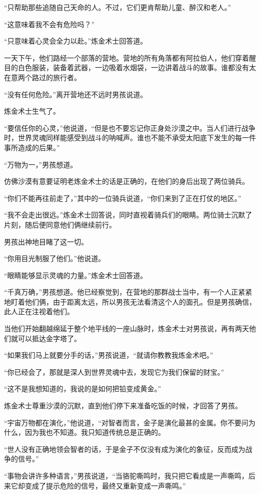 \documentclass[twoside,openany]{book}
\begin{document}
“只帮助那些追随自己天命的人。不过，它们更肯帮助儿童、醉汉和老人。”

“这意味着我不会有危险吗？”

“只意味着心灵会全力以赴。”炼金术士回答道。

一天下午，他们路经一个部落的营地。营地的所有角落都有阿拉伯人，他们穿着醒目的白色服装，装备着武器，一边吸着水烟袋，一边讲着战斗的故事。谁都没有太在意两个路过的旅行者。

“没有任何危险。”离开营地还不远时男孩说道。

炼金术士生气了。

“要信任你的心灵，”他说道，“但是也不要忘记你正身处沙漠之中。当人们进行战争时，世界灵魂同样能感受到战斗的呐喊声。谁也不能不承受太阳底下发生的每一件事所造成的后果。”

“万物为一，”男孩想道。

仿佛沙漠有意要证明老炼金术士的话是正确的，在他们的身后出现了两位骑兵。

“你们不能再往前走了，”其中的一位骑兵说道，“你们来到了正在打仗的地区。”

“我不会走出很远。”炼金术士回答说，同时直视着骑兵们的眼睛。两位骑士沉默了片刻，随后便同意他们俩继续前行。

男孩出神地目睹了这一切。

“你用目光制服了他们。”他说道。

“眼睛能够显示灵魂的力量。”炼金术士回答道。

“千真万确，”男孩想道。他已经察觉到，在营地的那群战士当中，有一个人正紧紧地盯着他们俩，由于距离太远，所以男孩无法看清这个人的面孔。但是男孩确信，此人正在注视着他们。

当他们开始翻越绵延于整个地平线的一座山脉时，炼金术士对男孩说，再有两天他们就可以抵达金字塔了。

“如果我们马上就要分手的话，”男孩说道，“就请你教教我炼金术吧。”

“你已经会了，那就是深人到世界灵魂中去，发现它为我们保留的财宝。”

“这不是我想知道的，我说的是如何把铅变成黄金。”

炼金术士尊重沙漠的沉默，直到他们停下来准备吃饭的时候，才回答了男孩。

“宇宙万物都在演化，”他说道，“对智者而言，金子是演化最甚的金属。你不要问为什么，因为我也不知道。我只知道传统总是正确的。

“世人没有正确地领会智者的话，于是金子不仅没有成为演化的象征，反而成为战争的信号。”

“事物会讲许多种语言，”男孩说道，“当骆驼嘶鸣时，我只把它看成是一声嘶鸣，后来它却变成了提示危险的信号，最终又重新变成一声嘶鸣。”
\end{document}
